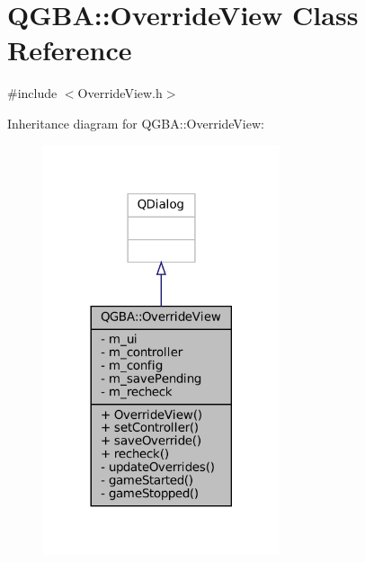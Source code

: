 \hypertarget{class_q_g_b_a_1_1_override_view}{}\section{Q\+G\+BA\+:\+:Override\+View Class Reference}
\label{class_q_g_b_a_1_1_override_view}


{\ttfamily \#include $<$Override\+View.\+h$>$}



Inheritance diagram for Q\+G\+BA\+:\+:Override\+View\+:
\nopagebreak
\begin{figure}[H]
\begin{center}
\leavevmode
\includegraphics[width=197pt]{class_q_g_b_a_1_1_override_view__inherit__graph}
\end{center}
\end{figure}


